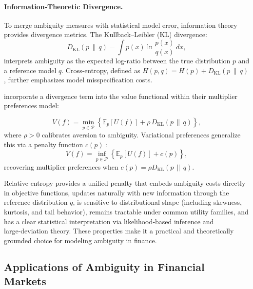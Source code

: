 \documentclass[preprint,12pt,authoryear]{elsarticle}
\begin{document}
\paragraph{Information‑Theoretic Divergence.} To merge ambiguity measures with statistical model error, information theory provides divergence metrics. The Kullback–Leibler (KL) divergence:
\begin{equation}
D_{\mathrm{KL}}(p\,\|\,q)=\int p(x)\ln\frac{p(x)}{q(x)}\,dx,
\end{equation}
interprets ambiguity as the expected log‑ratio between the true distribution $p$ and a reference model $q$. Cross‑entropy, defined as $H(p,q)=H(p)+D_{\mathrm{KL}}(p\,\|\,q)$, further emphasizes model misspecification costs.

\cite{hansen2001} incorporate a divergence term into the value functional within their multiplier preferences model:

\begin{equation}
V(f)=\min_{p\in\mathcal{P}}\left\{\mathbb{E}_p[U(f)] + \rho\,D_{\mathrm{KL}}(p\,\|\,q)\right\},
\end{equation}
where $\rho>0$ calibrates aversion to ambiguity. Variational preferences generalize this via a penalty function $c(p)$ \citep{maccheroni2006}:
\begin{equation}
V(f)=\inf_{p\in\mathcal{P}}\left\{\mathbb{E}_p[U(f)] + c(p)\right\},
\end{equation}
recovering multiplier preferences when $c(p)=\rho D_{\mathrm{KL}}(p\,\|\,q)$.

Relative entropy provides a unified penalty that embeds ambiguity costs directly in objective functions, updates naturally with new information through the reference distribution $q$, is sensitive to distributional shape (including skewness, kurtosis, and tail behavior), remains tractable under common utility families, and has a clear statistical interpretation via likelihood‑based inference and large‑deviation theory. These properties make it a practical and theoretically grounded choice for modeling ambiguity in finance.


\subsection{Applications of Ambiguity in Financial Markets}
\end{document}
